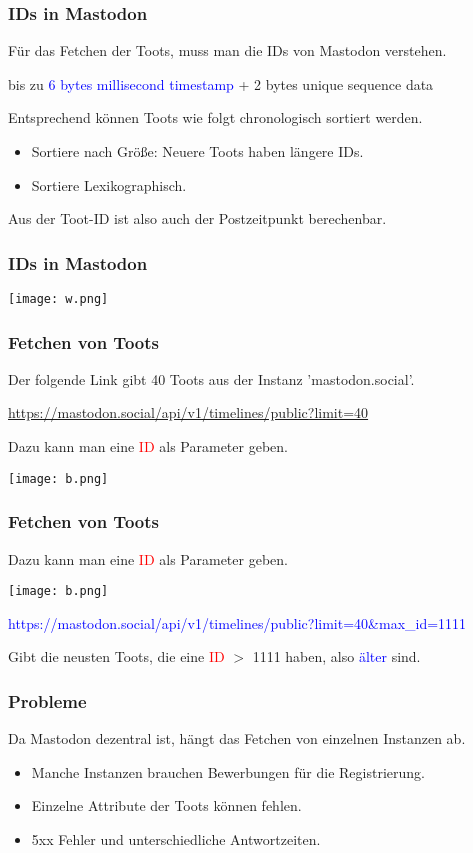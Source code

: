 \documentclass{beamer}
\newcommand{\blue}{\textcolor{blue}}
\newcommand{\red}{\textcolor{red}}
\begin{document}
\begin{frame}
    \frametitle{IDs in Mastodon}
    Für das Fetchen der Toots, muss man die IDs von Mastodon verstehen.
    \begin{center}
        bis zu \blue{6 bytes millisecond timestamp} + 2 bytes unique sequence data
    \end{center}
    Entsprechend können Toots wie folgt chronologisch sortiert werden.
    \begin{itemize}
        \item Sortiere nach Größe: Neuere Toots haben längere IDs.
        \item Sortiere Lexikographisch.
    \end{itemize}
    Aus der Toot-ID ist also auch der Postzeitpunkt berechenbar.
\end{frame}
\begin{frame}
    \frametitle{IDs in Mastodon}
    \begin{center}
        \texttt{[image: w.png]}
    \end{center}
\end{frame}
\begin{frame}
    \frametitle{Fetchen von Toots}
    Der folgende Link gibt 40 Toots aus der Instanz 'mastodon.social'.
    \begin{center}
        \blue{
            \href{https://mastodon.social/api/v1/timelines/public?limit=40}
            {https://mastodon.social/api/v1/timelines/public?limit=40}
        }
    \end{center}  
    Dazu kann man eine \red{ID} als Parameter geben.
    \begin{center}
        \texttt{[image: b.png]}
    \end{center}    
\end{frame}
\begin{frame}
    \frametitle{Fetchen von Toots}
    Dazu kann man eine \red{ID} als Parameter geben.
    \begin{center}
        \texttt{[image: b.png]}
    \end{center}   
    \begin{center}
        \blue{https://mastodon.social/api/v1/timelines/public?limit=40\&max\_id=1111}
    \end{center}  
    Gibt die neusten Toots, die eine \red{ID} $>$ 1111 haben, also \blue{älter} sind.
\end{frame}
\begin{frame}
    \frametitle{Probleme}
    Da Mastodon dezentral ist, hängt das Fetchen von einzelnen Instanzen ab.
    \begin{itemize}
        \item Manche Instanzen brauchen Bewerbungen für die Registrierung.
        \item Einzelne Attribute der Toots können fehlen.
        \item 5xx Fehler und unterschiedliche Antwortzeiten. 
    \end{itemize}
\end{frame}
\end{document}
